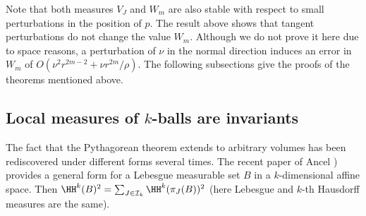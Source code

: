 Note that both measures $V_J$ and $W_m$ are also stable with respect
to small perturbations in the position of $p$. The result above shows
that tangent perturbations do not change the value $W_m$. Although we
do not prove it here due to space reasons, a perturbation of $\nu$ in
the normal direction induces an error in $W_m$ of $O(\nu^2
r^{2m-2}+\nu r^{2m} / \rho)$. The following subsections give the
proofs of the theorems mentioned above.

\subsection{Local measures of $k$-balls are invariants}

The fact that the Pythagorean theorem extends to arbitrary volumes has
been rediscovered under different forms several times. The recent
paper of Ancel \cite{ancel2023pythagorean}) provides a general form
for a Lebesgue measurable set $B$ in a $k$-dimensional affine
space. Then $\HH^k(B)^2=\sum_{J \in \mathcal{I}_k} \HH^k(\pi_J(B))^2$ (here
Lebesgue and $k$-th Hausdorff measures are the same).

